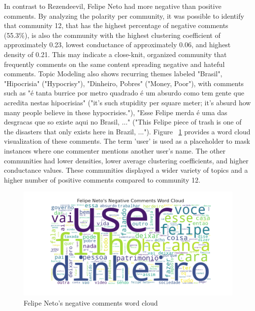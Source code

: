 \documentclass[sigconf]{acmart}
\begin{document}
In contrast to Rezendeevil, Felipe Neto had more negative than positive comments. 
By analyzing the polarity per community, it was possible to identify that community 12, 
that has the highest percentage of negative comments (55.3\%), is also the community with the highest clustering 
coefficient of approximately 0.23, lowest conductance of approximately 0.06, and highest density 
of 0.21. This may indicate a close-knit, organized community that frequently comments on the 
same content spreading negative and hateful comments. 
Topic Modeling also shows recurring themes labeled "Brasil", "Hipocrisia" 
("Hypocrisy"), "Dinheiro, Pobres" ("Money, Poor"), with comments such as 
"é tanta burrice por metro quadrado é um absurdo como tem gente que acredita nestas hipocrisias" 
("it's such stupidity per square meter; it's absurd how many people believe in these hypocrisies."),
"Esse Felipe merda é uma das desgracas que so existe aqui no Brasil, ..." 
("This Felipe piece of trash is one of the disasters that only exists here in Brazil, ..."). 
Figure ~\ref{fig:felipeneto_comments} provides a word cloud visualization of these comments.
The term 'user' is used as a placeholder to mask instances where one commenter mentions another user's 
name.
The other communities had lower densities, lower average clustering coefficients, and higher conductance values. These communities displayed a wider variety of topics and a higher number of positive 
comments compared to community 12. 

\begin{figure}[hbt!]
    \centering
    \includegraphics[keepaspectratio,width=\linewidth]{./imgs/felipeneto/negative_comments.png}
    \caption[width=\textwidth]{Felipe Neto's negative comments word cloud}
    \label{fig:felipeneto_comments}
\end{figure}
\end{document}
